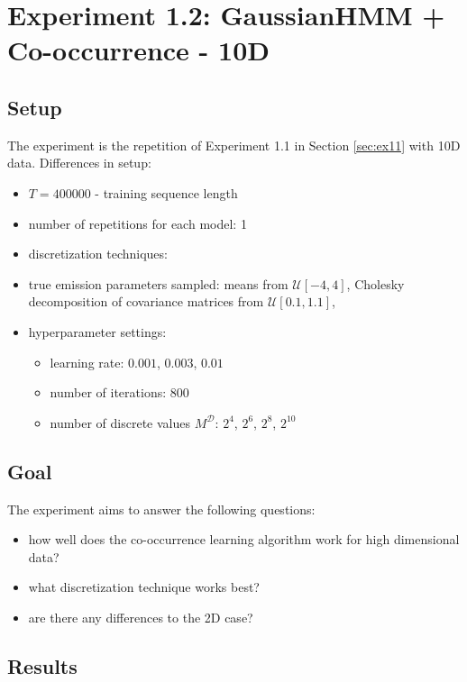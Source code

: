 \documentclass[shortabstract]{iithesis}
\begin{document}
\section{Experiment 1.2: GaussianHMM + Co-occurrence - 10D}

\subsection{Setup}

The experiment is the repetition of Experiment 1.1 in Section \ref{sec:ex11} with 10D data. Differences in setup: %

\begin{itemize}
    \item $T = 400000$ - training sequence length
    \item number of repetitions for each model: 1
    \item discretization techniques:
    \item true emission parameters sampled: means from $\mathcal U[-4, 4]$, Cholesky decomposition of covariance matrices from $\mathcal U[0.1, 1.1]$,
    \item hyperparameter settings:
    \begin{itemize}
        \item learning rate: $0.001$, $0.003$, $0.01$
        \item number of iterations: $800$
        \item number of discrete values $M^{\mathcal D}$: $2^4$, $2^6$, $2^8$, $2^{10}$
    \end{itemize}
\end{itemize}

\subsection{Goal}

The experiment aims to answer the following questions:
\begin{itemize}
    \item how well does the co-occurrence learning algorithm work for high dimensional data?
    \item what discretization technique works best?
    \item are there any differences to the 2D case?
\end{itemize}

\subsection{Results}
\end{document}
